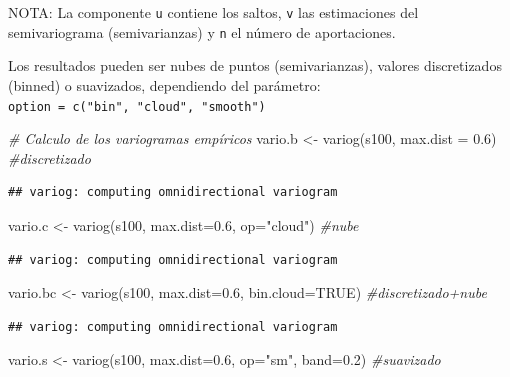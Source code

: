 \documentclass[
  spanish,
]{book}
\newenvironment{Shaded}{\begin{snugshade}}{\end{snugshade}}
\newcommand{\AttributeTok}[1]{\textcolor[rgb]{0.77,0.63,0.00}{#1}}
\newcommand{\CommentTok}[1]{\textcolor[rgb]{0.56,0.35,0.01}{\textit{#1}}}
\newcommand{\ConstantTok}[1]{\textcolor[rgb]{0.00,0.00,0.00}{#1}}
\newcommand{\FloatTok}[1]{\textcolor[rgb]{0.00,0.00,0.81}{#1}}
\newcommand{\FunctionTok}[1]{\textcolor[rgb]{0.00,0.00,0.00}{#1}}
\newcommand{\NormalTok}[1]{#1}
\newcommand{\OtherTok}[1]{\textcolor[rgb]{0.56,0.35,0.01}{#1}}
\newcommand{\StringTok}[1]{\textcolor[rgb]{0.31,0.60,0.02}{#1}}
\theoremstyle{break}
\theoremstyle{definition}
\theoremstyle{definition}
\theoremstyle{definition}
\theoremstyle{definition}
\theoremstyle{remark}
\begin{document}
NOTA: La componente \texttt{u} contiene los saltos, \texttt{v} las estimaciones del
semivariograma (semivarianzas) y \texttt{n} el número de aportaciones.

Los resultados pueden ser nubes de puntos (semivarianzas), valores
discretizados (binned) o suavizados, dependiendo del parámetro:
\texttt{option\ =\ c("bin",\ "cloud",\ "smooth")}

\begin{Shaded}
\begin{Highlighting}[]
\CommentTok{\# Calculo de los variogramas empíricos}
\NormalTok{vario.b }\OtherTok{\textless{}{-}} \FunctionTok{variog}\NormalTok{(s100, }\AttributeTok{max.dist =} \FloatTok{0.6}\NormalTok{) }\CommentTok{\#discretizado}
\end{Highlighting}
\end{Shaded}

\begin{verbatim}
## variog: computing omnidirectional variogram
\end{verbatim}

\begin{Shaded}
\begin{Highlighting}[]
\NormalTok{vario.c }\OtherTok{\textless{}{-}} \FunctionTok{variog}\NormalTok{(s100, }\AttributeTok{max.dist=}\FloatTok{0.6}\NormalTok{, }\AttributeTok{op=}\StringTok{"cloud"}\NormalTok{)  }\CommentTok{\#nube}
\end{Highlighting}
\end{Shaded}

\begin{verbatim}
## variog: computing omnidirectional variogram
\end{verbatim}

\begin{Shaded}
\begin{Highlighting}[]
\NormalTok{vario.bc }\OtherTok{\textless{}{-}} \FunctionTok{variog}\NormalTok{(s100, }\AttributeTok{max.dist=}\FloatTok{0.6}\NormalTok{, }\AttributeTok{bin.cloud=}\ConstantTok{TRUE}\NormalTok{)  }\CommentTok{\#discretizado+nube}
\end{Highlighting}
\end{Shaded}

\begin{verbatim}
## variog: computing omnidirectional variogram
\end{verbatim}

\begin{Shaded}
\begin{Highlighting}[]
\NormalTok{vario.s }\OtherTok{\textless{}{-}} \FunctionTok{variog}\NormalTok{(s100, }\AttributeTok{max.dist=}\FloatTok{0.6}\NormalTok{, }\AttributeTok{op=}\StringTok{"sm"}\NormalTok{, }\AttributeTok{band=}\FloatTok{0.2}\NormalTok{)  }\CommentTok{\#suavizado}
\end{Highlighting}
\end{Shaded}
\end{document}
